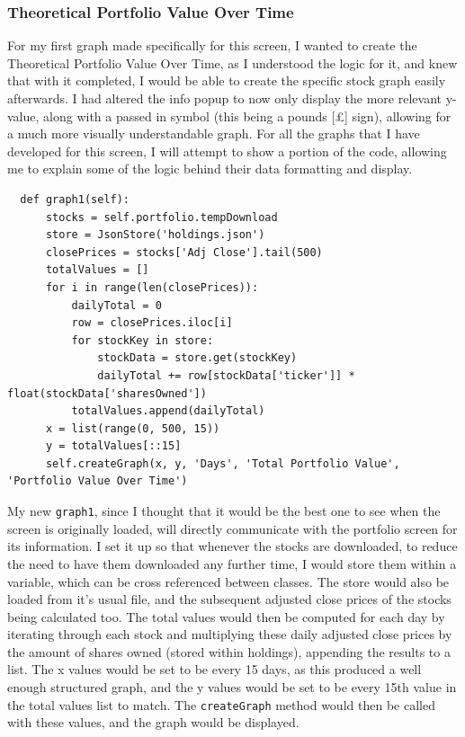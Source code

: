 \documentclass{article}
\begin{document}
\subsubsection{Theoretical Portfolio Value Over Time}
For my first graph made specifically for this screen, I wanted to create the Theoretical Portfolio Value Over Time, as I understood the logic for it, and knew that with it completed, I would be able to create the specific stock graph easily afterwards. I had altered the info popup to now only display the more relevant y-value, along with a passed in symbol (this being a pounds [\pounds] sign), allowing for a much more visually understandable graph. For all the graphs that I have developed for this screen, I will attempt to show a portion of the code, allowing me to explain some of the logic behind their data formatting and display.\\\vspace{0.3cm}

\begin{verbatim}
  def graph1(self):
      stocks = self.portfolio.tempDownload
      store = JsonStore('holdings.json')
      closePrices = stocks['Adj Close'].tail(500)
      totalValues = []
      for i in range(len(closePrices)):
          dailyTotal = 0
          row = closePrices.iloc[i]
          for stockKey in store:
              stockData = store.get(stockKey)
              dailyTotal += row[stockData['ticker']] * float(stockData['sharesOwned'])
          totalValues.append(dailyTotal)
      x = list(range(0, 500, 15))
      y = totalValues[::15]
      self.createGraph(x, y, 'Days', 'Total Portfolio Value', 'Portfolio Value Over Time')
\end{verbatim}

\vspace{0.3cm}
My new \texttt{graph1}, since I thought that it would be the best one to see when the screen is originally loaded, will directly communicate with the portfolio screen for its information. I set it up so that whenever the stocks are downloaded, to reduce the need to have them downloaded any further time, I would store them within a variable, which can be cross referenced between classes. The store would also be loaded from it's usual file, and the subsequent adjusted close prices of the stocks being calculated too. The total values would then be computed for each day by iterating through each stock and multiplying these daily adjusted close prices by the amount of shares owned (stored within holdings), appending the results to a list. The x values would be set to be every 15 days, as this produced a well enough structured graph, and the y values would be set to be every 15th value in the total values list to match. The \texttt{createGraph} method would then be called with these values, and the graph would be displayed.\\\vspace{0.3cm}
\end{document}
